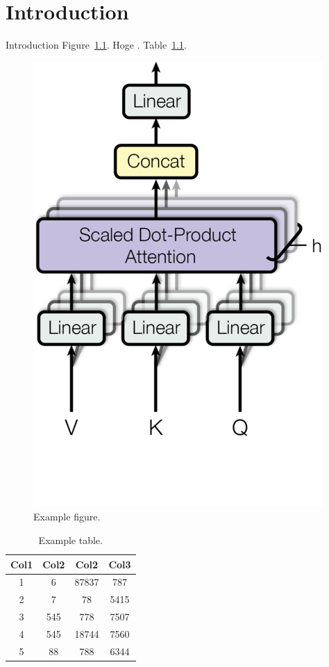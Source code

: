\chapter{Introduction}\label{ch:introduction}
Introduction Figure~\ref{fig:ex-fig}. Hoge \cite{devlin-etal-2019-bert}. Table~\ref{tab:ex-tab}.

\begin{figure}[h]
    \centering
    \includegraphics{figures/fig-vkq.png}
    \caption[Example figure]{Example figure.}
    \label{fig:ex-fig}
\end{figure}

\begin{table}[h]
    \centering
    \begin{tabular}{||c c c c||} 
        \hline
        Col1 & Col2 & Col2 & Col3 \\ [0.5ex] 
        \hline\hline
        1 & 6 & 87837 & 787 \\ 
        2 & 7 & 78 & 5415 \\
        3 & 545 & 778 & 7507 \\
        4 & 545 & 18744 & 7560 \\
        5 & 88 & 788 & 6344 \\ [1ex] 
        \hline
    \end{tabular}
    \caption[Example table]{Example table.}
    \label{tab:ex-tab}
\end{table}